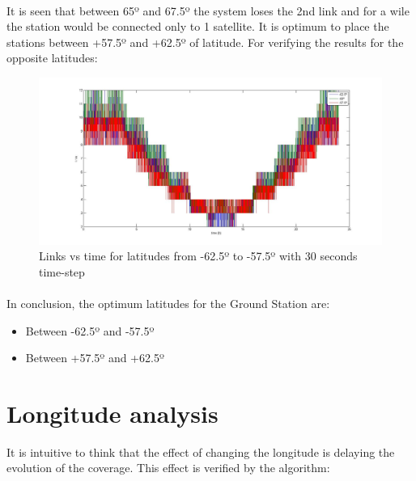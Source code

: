 \documentclass[12pt,a4paper]{report}
\begin{document}
\paragraph{}
It is seen that between 65º and 67.5º the system loses the 2nd link and for a wile the station would be connected only to 1 satellite. It is optimum to place the stations between +57.5º and +62.5º of latitude. For verifying the results for the opposite latitudes:

\begin{figure}[H]
\begin{center}
\includegraphics[scale=0.30]{-625_-25_575_(30s)_lat.jpg}
\caption{Links vs time for latitudes from -62.5º to -57.5º with 30 seconds time-step}
\end{center}
\end{figure}

\paragraph{}
In conclusion, the optimum latitudes for the Ground Station are:
\begin{itemize}
\item Between -62.5º and -57.5º
\item Between +57.5º and +62.5º
\end{itemize}

\section{Longitude analysis}
It is intuitive to think that the effect of changing the longitude is delaying the evolution of the coverage. This effect is verified by the algorithm:
\end{document}
